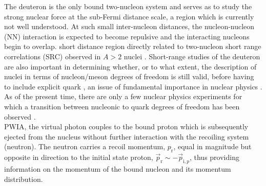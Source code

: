 The deuteron is the only bound two-nucleon system and serves as \DIFdelbegin {}\DIFdelend \DIFaddbegin {}\DIFaddend to study the strong nuclear force at the sub-Fermi distance scale, a region which is currently
\DIFaddbegin {}\DIFaddend not well understood. At such small inter-nucleon distances, the nucleon-nucleon (NN) interaction is expected to become repulsive and the interacting
nucleons begin to overlap. \DIFdelbegin {}\DIFdelend \DIFaddbegin {}\DIFaddend short distance region \DIFdelbegin {}\DIFdelend \DIFaddbegin {}\DIFaddend directly related to \DIFaddbegin {}\DIFaddend two-nucleon short range correlations (SRC) observed in $A>2$ nuclei \cite{PhysRevC.68.014313,PhysRevLett.96.082501,PhysRevLett.99.072501,Fomin_2017,Barack_2019,RevModPhys.89.045002}.
Short-range studies of the deuteron are also important in determining whether, or to what extent, the description of nuclei in terms of nucleon/meson degrees of freedom is still valid, before
having to include explicit quark \DIFdelbegin {}\DIFdelend \DIFaddbegin {}\DIFaddend , an issue of fundamental importance in nuclear physics \cite{sargsian_2015}. As of the present time, there are only a few nuclear physics experiments for
which a transition between nucleonic to quark degrees of freedom has been observed \cite{PhysRevLett.81.4576,PhysRevLett.87.102302,PhysRevC.66.042201}. \\
\indent \DIFdelbegin {}\DIFdelend \DIFaddbegin {}\DIFaddend PWIA, the virtual photon couples to
the bound proton which is subsequently ejected from the nucleus without further interaction with the recoiling system (neutron). The neutron carries a recoil momentum, $p_{\mathrm{r}}$, equal in magnitude but opposite in direction
to the initial state proton, $\vec{p}_{\mathrm{r}} \sim -\vec{p}_{\mathrm{i},p}$, thus providing information on the momentum of the bound nucleon and its momentum distribution.\DIFdelbegin {}\DIFdelend \\
